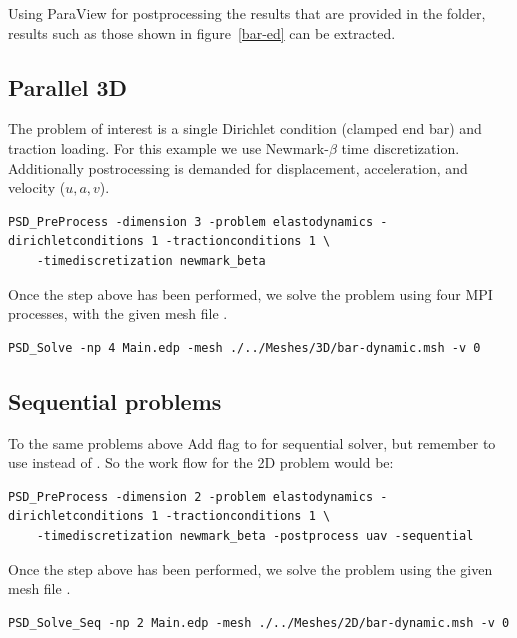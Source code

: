{{Using ParaView for postprocessing the results that are provided in the  folder, results such as those shown in figure~\ref{bar-ed} can be extracted. 

\subsection{Parallel 3D}

The problem of interest is a single Dirichlet condition (clamped end bar) and traction loading. For this example we use Newmark-$\beta$ time discretization. Additionally postrocessing is demanded for displacement, acceleration, and velocity ($u,a,v$). 

\begin{lstlisting}[style=BashInputStyle]
	PSD_PreProcess -dimension 3 -problem elastodynamics -dirichletconditions 1 -tractionconditions 1 \
	-timediscretization newmark_beta
\end{lstlisting}

Once the step above has been performed, we solve the problem using four MPI processes, with the given mesh file . 

\begin{lstlisting}[style=BashInputStyle]
	PSD_Solve -np 4 Main.edp -mesh ./../Meshes/3D/bar-dynamic.msh -v 0
\end{lstlisting}


\subsection{Sequential problems}

To the same problems above Add  flag to  for sequential solver, but remember to use  instead of . So the work flow for the 2D problem would be:

\begin{lstlisting}[style=BashInputStyle]
	PSD_PreProcess -dimension 2 -problem elastodynamics -dirichletconditions 1 -tractionconditions 1 \
	-timediscretization newmark_beta -postprocess uav -sequential
\end{lstlisting}

Once the step above has been performed, we solve the problem using the given mesh file . 

\begin{lstlisting}[style=BashInputStyle]
	PSD_Solve_Seq -np 2 Main.edp -mesh ./../Meshes/2D/bar-dynamic.msh -v 0
\end{lstlisting}

}}
